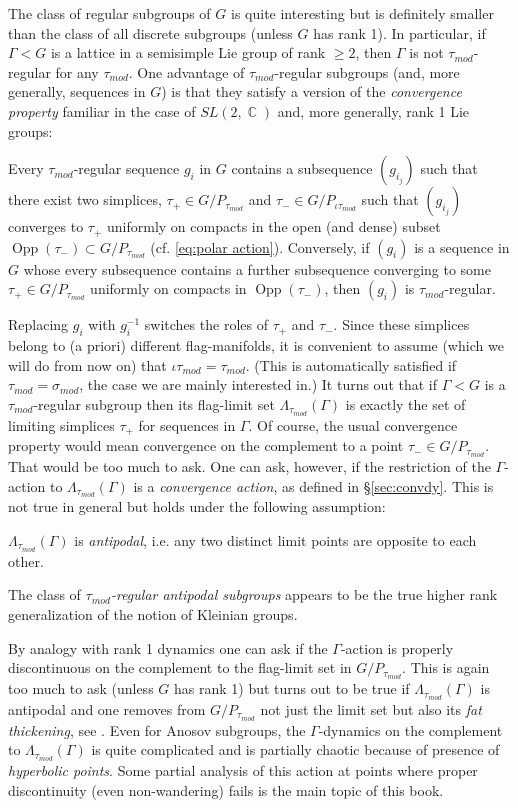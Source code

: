\documentclass[12pt]{amsbook}%
\theoremstyle{definition}
\theoremstyle{remark}
\numberwithin{section}{chapter}
\numberwithin{subsection}{section}
\numberwithin{figure}{chapter}
\DeclareMathOperator{\C}{\mathbb{C}}
\DeclareMathOperator{\Opp}{Opp}
\def\taumod{\tau_{mod}}
\def\simod{\sigma_{mod}}
\def\Ga{\Gamma}
\def\La{\Lambda}
\begin{document}
{{The class of regular subgroups of $G$ is quite interesting but is definitely smaller than the class 
of all discrete subgroups (unless $G$ has rank 1). In particular, if $\Ga< G$ is a lattice in a semisimple 
Lie group of rank $\ge 2$, then $\Ga$ is not $\taumod$-regular for any $\taumod$. One advantage of $\taumod$-regular subgroups (and, more generally, sequences in $G$) is that they satisfy a version of the {\em convergence property} familiar in the case of $SL(2,\C)$ and, more generally, rank 1 Lie groups:

Every $\taumod$-regular sequence $g_i$ in $G$ contains a subsequence $(g_{i_j})$ such that there exist two simplices, $\tau_+\in G/P_{\taumod}$ and 
$\tau_-\in G/P_{\iota\taumod}$ such that $(g_{i_j})$ converges to $\tau_+$ uniformly on compacts in the open (and dense) subset 
$\Opp(\tau_-)\subset G/P_{\taumod}$ (cf. \eqref{eq:polar action}).  
Conversely, if $(g_{i})$ is a sequence in $G$ 
whose every subsequence contains a further subsequence  converging to some 
$\tau_+\in G/P_{\taumod}$ uniformly on compacts in $\Opp(\tau_-)$, then $(g_i)$ is $\taumod$-regular. 

Replacing $g_i$ with $g_i^{-1}$ switches the roles 
of $\tau_+$ and $\tau_-$. Since these simplices belong to (a priori) different flag-manifolds, it is convenient to assume (which we will do from now on) 
that $\iota\taumod=\taumod$. (This is automatically satisfied if $\taumod=\simod$, the case we are 
mainly interested in.) It turns out that if $\Ga< G$ is a 
$\taumod$-regular subgroup then its flag-limit set $\La_{\taumod}(\Ga)$ is exactly the set of limiting simplices 
$\tau_+$ for sequences in $\Ga$. Of course, the usual convergence property would mean convergence on the complement to  
a point $\tau_-\in  G/P_{\taumod}$. That would be too much to ask. One can ask, however, if the restriction of the $\Ga$-action to 
$\La_{\taumod}(\Ga)$ is a {\em convergence action}, as defined in \S \ref{sec:convdy}. %
This is not true in general but holds under the following assumption:

$\La_{\taumod}(\Ga)$ is {\em antipodal}, i.e. any two distinct limit points are opposite to each other. 

The class of {\em $\taumod$-regular antipodal subgroups} appears to be the true higher rank generalization of the notion of Kleinian groups. 


By analogy with rank 1 dynamics one can ask if the $\Ga$-action is properly discontinuous on the complement to 
the flag-limit set in $G/P_{\taumod}$. This is again too much to ask (unless $G$ has rank 1) but turns out to be true if 
$\La_{\taumod}(\Ga)$ is antipodal and one removes from $G/P_{\taumod}$ not just the limit set but also its {\em fat thickening}, see 
\cite{KLP17}.  Even for Anosov subgroups, the $\Ga$-dynamics on the complement to $\La_{\taumod}(\Ga)$ is quite complicated 
and is partially chaotic because of presence of {\em hyperbolic points}. Some partial analysis of this action at points where proper 
discontinuity (even non-wandering) fails is the main topic of this book. 


}}
\end{document}
